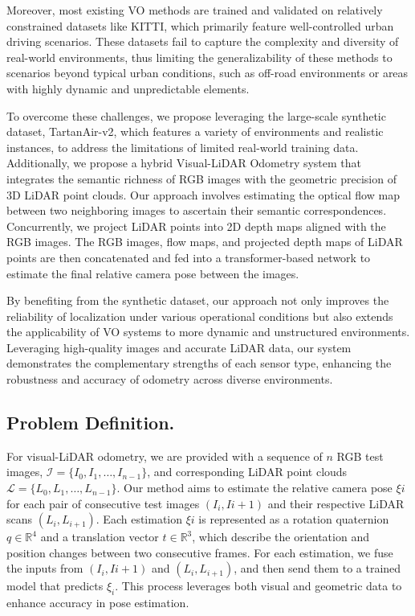 \documentclass[11pt,a4paper]{article}
\begin{document}
Moreover, most existing VO methods are trained and validated on relatively constrained datasets like KITTI, which primarily feature well-controlled urban driving scenarios. These datasets fail to capture the complexity and diversity of real-world environments, thus limiting the generalizability of these methods to scenarios beyond typical urban conditions, such as off-road environments or areas with highly dynamic and unpredictable elements.

To overcome these challenges, we propose leveraging the large-scale synthetic dataset, TartanAir-v2, which features a variety of environments and realistic instances, to address the limitations of limited real-world training data. Additionally, we propose a hybrid Visual-LiDAR Odometry system that integrates the semantic richness of RGB images with the geometric precision of 3D LiDAR point clouds. Our approach involves estimating the optical flow map between two neighboring images to ascertain their semantic correspondences. Concurrently, we project LiDAR points into 2D depth maps aligned with the RGB images. The RGB images, flow maps, and projected depth maps of LiDAR points are then concatenated and fed into a transformer-based network to estimate the final relative camera pose between the images.

By benefiting from the synthetic dataset, our approach not only improves the reliability of localization under various operational conditions but also extends the applicability of VO systems to more dynamic and unstructured environments. Leveraging high-quality images and accurate LiDAR data, our system demonstrates the complementary strengths of each sensor type, enhancing the robustness and accuracy of odometry across diverse environments.




\subsection{Problem Definition.} For visual-LiDAR odometry, we are provided with a sequence of $n$ RGB test images, $\mathcal{I} = \{I_0, I_1, \dots, I_{n-1}\}$, and corresponding LiDAR point clouds $\mathcal{L} = \{L_0, L_1, \dots, L_{n-1}\}$. Our method aims to estimate the relative camera pose ${\xi}i$ for each pair of consecutive test images $(I_i, I{i+1})$ and their respective LiDAR scans $(L_i, L_{i+1})$. Each estimation ${\xi}i$ is represented as a rotation quaternion $q \in \mathbb{R}^4$ and a translation vector $t \in \mathbb{R}^3$, which describe the orientation and position changes between two consecutive frames. For each estimation, we fuse the inputs from $(I_i, I{i+1})$ and $(L_i, L_{i+1})$, and then send them to a trained model that predicts ${\xi}_i$. This process leverages both visual and geometric data to enhance accuracy in pose estimation.
\end{document}
